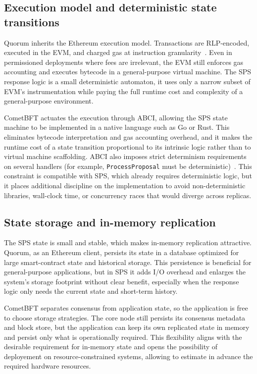 \subsection{Execution model and deterministic state transitions}
Quorum inherits the Ethereum execution model. Transactions are RLP-encoded, executed in the EVM, and charged gas at instruction granularity~\cite{buterin2013ethereum}. Even in permissioned deployments where fees are irrelevant, the EVM still enforces gas accounting and executes bytecode in a general-purpose virtual machine. The SPS response logic is a small deterministic automaton, it uses only a narrow subset of EVM's instrumentation while paying the full runtime cost and complexity of a general-purpose environment.

CometBFT actuates the execution through ABCI, allowing the SPS state machine to be implemented in a native language such as Go or Rust. This eliminates bytecode interpretation and gas accounting overhead, and it makes the runtime cost of a state transition proportional to its intrinsic logic rather than to virtual machine scaffolding. ABCI also imposes strict determinism requirements on several handlers (for example, \texttt{ProcessProposal} must be deterministic)~\cite{abciOverview}. This constraint is compatible with SPS, which already requires deterministic logic, but it places additional discipline on the implementation to avoid non-deterministic libraries, wall-clock time, or concurrency races that would diverge across replicas.

\subsection{State storage and in-memory replication}
The SPS state is small and stable, which makes in-memory replication attractive. Quorum, as an Ethereum client, persists its state in a database optimized for large smart-contract state and historical storage. This persistence is beneficial for general-purpose applications, but in SPS it adds I/O overhead and enlarges the system's storage footprint without clear benefit, especially when the response logic only needs the current state and short-term history.

CometBFT separates consensus from application state, so the application is free to choose storage strategies. The core node still persists its consensus metadata and block store, but the application can keep its own replicated state in memory and persist only what is operationally required. This flexibility aligns with the desirable requirement for in-memory state and opens the possibility of deployement on resource-constrained systems, allowing to estimate in advance the required hardware resources.


